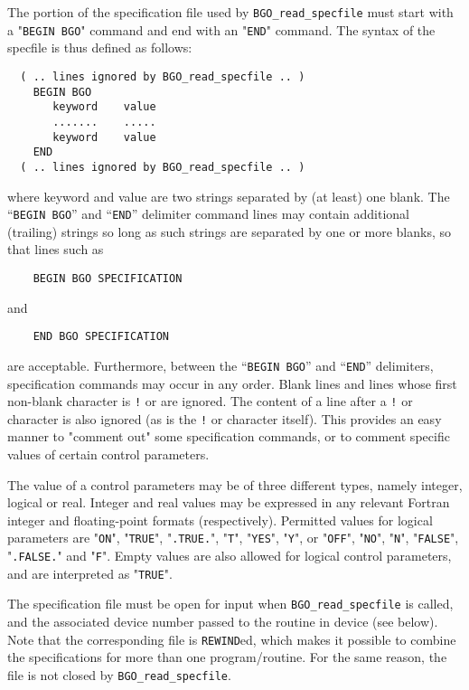 \documentclass{galahad}
\newcommand{\packagename}{BGO}
\begin{document}
The portion of the specification file used by
{\tt \packagename\_read\_specfile}
must start
with a "{\tt BEGIN \packagename}" command and end with an
"{\tt END}" command.  The syntax of the specfile is thus defined as follows:
\begin{verbatim}
  ( .. lines ignored by BGO_read_specfile .. )
    BEGIN BGO
       keyword    value
       .......    .....
       keyword    value
    END
  ( .. lines ignored by BGO_read_specfile .. )
\end{verbatim}
where keyword and value are two strings separated by (at least) one blank.
The ``{\tt BEGIN \packagename}'' and ``{\tt END}'' delimiter command lines
may contain additional (trailing) strings so long as such strings are
separated by one or more blanks, so that lines such as
\begin{verbatim}
    BEGIN BGO SPECIFICATION
\end{verbatim}
and
\begin{verbatim}
    END BGO SPECIFICATION
\end{verbatim}
are acceptable. Furthermore,
between the
``{\tt BEGIN \packagename}'' and ``{\tt END}'' delimiters,
specification commands may occur in any order.  Blank lines and
lines whose first non-blank character is {\tt !} or {\tt *} are ignored.
The content
of a line after a {\tt !} or {\tt *} character is also
ignored (as is the {\tt !} or {\tt *}
character itself). This provides an easy manner to "comment out" some
specification commands, or to comment specific values
of certain control parameters.

The value of a control parameters may be of three different types, namely
integer, logical or real.
Integer and real values may be expressed in any relevant Fortran integer and
floating-point formats (respectively). Permitted values for logical
parameters are "{\tt ON}", "{\tt TRUE}", "{\tt .TRUE.}", "{\tt T}",
"{\tt YES}", "{\tt Y}", or "{\tt OFF}", "{\tt NO}",
"{\tt N}", "{\tt FALSE}", "{\tt .FALSE.}" and "{\tt F}".
Empty values are also allowed for
logical control parameters, and are interpreted as "{\tt TRUE}".

The specification file must be open for
input when {\tt \packagename\_read\_specfile}
is called, and the associated device number
passed to the routine in device (see below).
Note that the corresponding
file is {\tt REWIND}ed, which makes it possible to combine the specifications
for more than one program/routine.  For the same reason, the file is not
closed by {\tt \packagename\_read\_specfile}.
\end{document}
